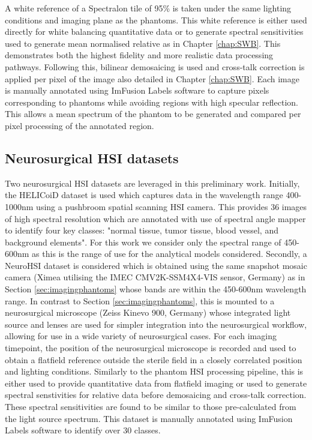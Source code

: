 A white reference of a Spectralon tile of 95\% is taken under the same lighting conditions and imaging plane as the phantoms. This white reference is either used directly for white balancing quantitative data or to generate spectral sensitivities used to generate mean normalised relative as in Chapter \ref{chap:SWB}. This demonstrates both the highest fidelity and more realistic data processing pathways. Following this, bilinear demosaicing is used and cross-talk correction is applied per pixel of the image also detailed in Chapter \ref{chap:SWB}. 
Each image is manually annotated using ImFusion Labels software to capture pixels corresponding to phantoms while avoiding regions with high specular reflection. This allows a mean spectrum of the phantom to be generated and compared per pixel processing of the annotated region. 

\subsection{Neurosurgical HSI datasets}\label{sec:NeuroHSIdata}
Two neurosurgical HSI datasets are leveraged in this preliminary work. Initially, the HELICoiD dataset is used which captures data in the wavelength range 400-1000nm using a pushbroom spatial scanning HSI camera\cite{Fabelo2019}. This provides 36 images of high spectral resolution which are annotated with use of spectral angle mapper to identify four key classes: "normal tissue, tumor tissue, blood vessel, and background elements". For this work we consider only the spectral range of 450-600nm as this is the range of use for the analytical models considered. Secondly, a NeuroHSI dataset is considered which is obtained using the same snapshot mosaic camera (Ximea utilising the IMEC CMV2K-SSM4X4-VIS sensor, Germany) as in Section \ref{sec:imagingphantoms} whose bands are within the 450-600nm wavelength range. In contrast to Section \ref{sec:imagingphantoms}, this is mounted to a neurosurgical microscope (Zeiss Kinevo 900, Germany) whose integrated light source and lenses are used for simpler integration into the neurosurgical workflow, allowing for use in a wide variety of neurosurgical cases. For each imaging timepoint, the position of the neurosurgical microscope is recorded and used to obtain a flatfield reference outside the sterile field in a closely correlated position and lighting conditions. Similarly to the phantom HSI processing pipeline, this is either used to provide quantitative data from flatfield imaging or used to generate spectral senstivities for relative data before demosaicing and cross-talk correction. These spectral sensitivities are found to be similar to those pre-calculated from the light source spectrum. This dataset is manually annotated using ImFusion Labels software to identify over 30 classes. 

